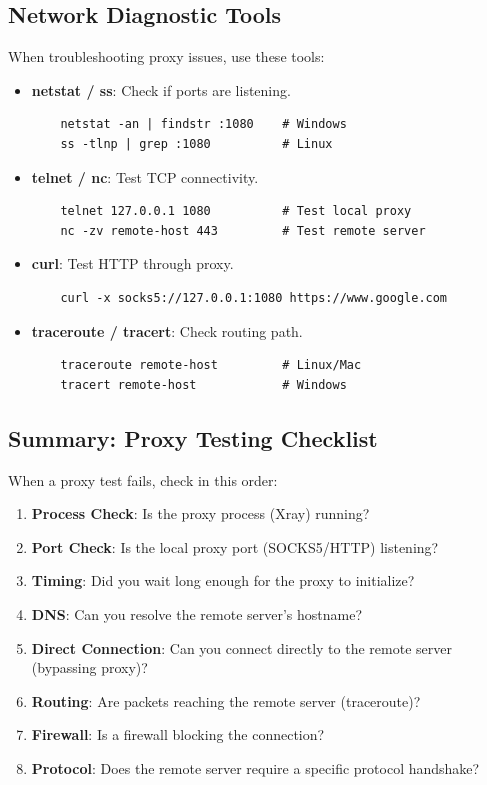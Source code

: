 \subsection{Network Diagnostic Tools}

When troubleshooting proxy issues, use these tools:

\begin{itemize}
    \item \textbf{netstat / ss}: Check if ports are listening.
    \begin{verbatim}
    netstat -an | findstr :1080    # Windows
    ss -tlnp | grep :1080          # Linux
    \end{verbatim}
    
    \item \textbf{telnet / nc}: Test TCP connectivity.
    \begin{verbatim}
    telnet 127.0.0.1 1080          # Test local proxy
    nc -zv remote-host 443         # Test remote server
    \end{verbatim}
    
    \item \textbf{curl}: Test HTTP through proxy.
    \begin{verbatim}
    curl -x socks5://127.0.0.1:1080 https://www.google.com
    \end{verbatim}
    
    \item \textbf{traceroute / tracert}: Check routing path.
    \begin{verbatim}
    traceroute remote-host         # Linux/Mac
    tracert remote-host            # Windows
    \end{verbatim}
\end{itemize}

\subsection{Summary: Proxy Testing Checklist}

When a proxy test fails, check in this order:

\begin{enumerate}
    \item \textbf{Process Check}: Is the proxy process (Xray) running?
    \item \textbf{Port Check}: Is the local proxy port (SOCKS5/HTTP) listening?
    \item \textbf{Timing}: Did you wait long enough for the proxy to initialize?
    \item \textbf{DNS}: Can you resolve the remote server's hostname?
    \item \textbf{Direct Connection}: Can you connect directly to the remote server (bypassing proxy)?
    \item \textbf{Routing}: Are packets reaching the remote server (traceroute)?
    \item \textbf{Firewall}: Is a firewall blocking the connection?
    \item \textbf{Protocol}: Does the remote server require a specific protocol handshake?
\end{enumerate}


